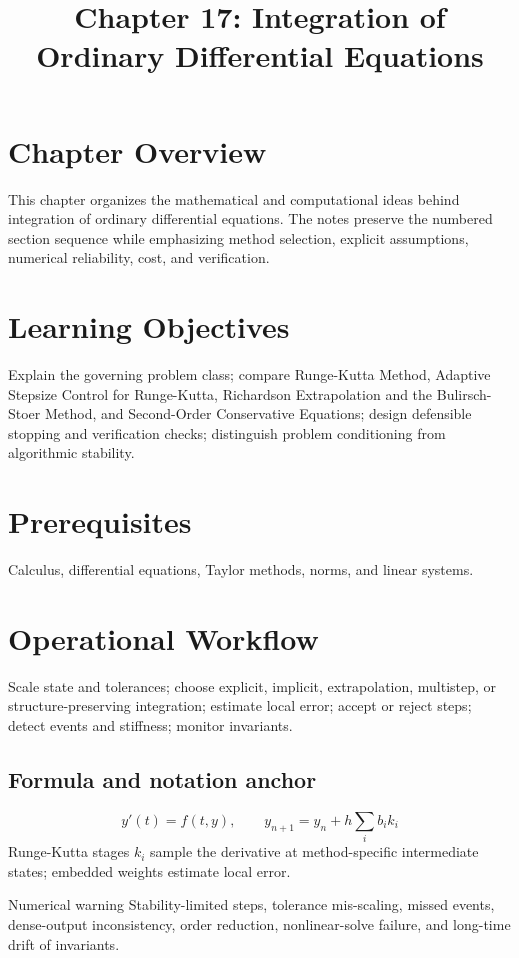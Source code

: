 \documentclass[10pt,letterpaper]{article}
\title{Chapter 17: Integration of Ordinary Differential Equations}
\author{}
\date{}
\begin{document}
\maketitle

\section*{Chapter Overview}
This chapter organizes the mathematical and computational ideas behind integration of ordinary differential equations. The notes preserve the numbered section sequence while emphasizing method selection, explicit assumptions, numerical reliability, cost, and verification.

\section*{Learning Objectives}
Explain the governing problem class; compare Runge-Kutta Method, Adaptive Stepsize Control for Runge-Kutta, Richardson Extrapolation and the Bulirsch-Stoer Method, and Second-Order Conservative Equations; design defensible stopping and verification checks; distinguish problem conditioning from algorithmic stability.

\section*{Prerequisites}
Calculus, differential equations, Taylor methods, norms, and linear systems.

\section*{Operational Workflow}
Scale state and tolerances; choose explicit, implicit, extrapolation, multistep, or structure-preserving integration; estimate local error; accept or reject steps; detect events and stiffness; monitor invariants.

\subsection*{Formula and notation anchor}
\[
y'(t)=f(t,y),\qquad y_{n+1}=y_n+h\sum_i b_i k_i
\]
Runge-Kutta stages $k_i$ sample the derivative at method-specific intermediate states; embedded weights estimate local error.

\begin{warnbox}{Numerical warning}
Stability-limited steps, tolerance mis-scaling, missed events, dense-output inconsistency, order reduction, nonlinear-solve failure, and long-time drift of invariants.
\end{warnbox}
\end{document}
